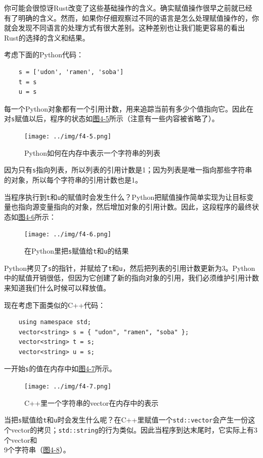 你可能会很惊讶Rust改变了这些基础操作的含义。确实赋值操作很早之前就已经有了明确的含义。然而，如果你仔细观察过不同的语言是怎么处理赋值操作的，你就会发现不同语言的处理方式有很大差别。这种差别也让我们能更容易的看出Rust的选择的含义和结果。

考虑下面的Python代码：
\begin{verbatim}
    s = ['udon', 'ramen', 'soba']
    t = s
    u = s
\end{verbatim}

每一个Python对象都有一个引用计数，用来追踪当前有多少个值指向它。因此在对\texttt{s}赋值以后，程序的状态如\hyperref[f4-5]{图4-5}所示（注意有一些内容被省略了）。

\begin{figure}[htbp]
    \centering
    \texttt{[image: ../img/f4-5.png]}
    \caption{Python如何在内存中表示一个字符串的列表}
    \label{f4-5}
\end{figure}

因为只有\texttt{s}指向列表，所以列表的引用计数是1；因为列表是唯一指向那些字符串的对象，所以每个字符串的引用计数也是1。

当程序执行到\texttt{t}和\texttt{u}的赋值时会发生什么？Python把赋值操作简单实现为让目标变量也指向源变量指向的对象，然后增加对象的引用计数。因此，这段程序的最终状态如\hyperref[f4-6]{图4-6}所示：
\begin{figure}[htbp]
    \centering
    \texttt{[image: ../img/f4-6.png]}
    \caption{在Python里把\texttt{s}赋值给\texttt{t}和\texttt{u}的结果}
    \label{f4-6}
\end{figure}

Python拷贝了\texttt{s}的指针，并赋给了\texttt{t}和\texttt{u}，然后把列表的引用计数更新为3。Python中的赋值开销很低，但因为它创建了新的指向对象的引用，我们必须维护引用计数来知道我们什么时候可以释放值。

现在考虑下面类似的C++代码：
\begin{verbatim}
    using namespace std;
    vector<string> s = { "udon", "ramen", "soba" };
    vector<string> t = s;
    vector<string> u = s;
\end{verbatim}

一开始\texttt{s}的值在内存中如\hyperref[f4-7]{图4-7}所示。

\begin{figure}[htbp]
    \centering
    \texttt{[image: ../img/f4-7.png]}
    \caption{C++里一个字符串的vector在内存中的表示}
    \label{f4-7}
\end{figure}

当把\texttt{s}赋值给\texttt{t}和\texttt{u}时会发生什么呢？在C++里赋值一个\texttt{std::vector}会产生一份这个vector的拷贝；\texttt{std::string}的行为类似。因此当程序到达末尾时，它实际上有3个vector和\\
9个字符串（\hyperref[f4-8]{图4-8}）。

